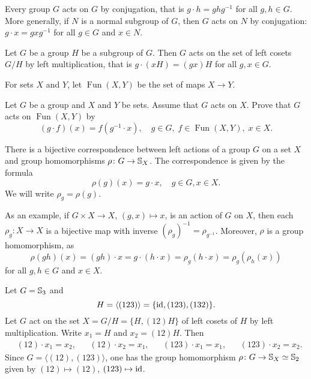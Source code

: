\begin{example}
Every group $G$ acts on $G$ by conjugation, that is
$g\cdot h=ghg^{-1}$ for all $g,h\in G$. More generally, 
if $N$ is a normal subgroup of $G$, then $G$ acts on
$N$ by conjugation: $g\cdot x=gx
g^{-1}$ for all $g\in G$ and $x\in N$. 
\end{example}

\begin{example}
Let $G$ be a group $H$ be a subgroup of $G$. Then $G$ 
acts on the set of left cosets $G/H$ by left multiplication, that 
is $g\cdot (xH)=(gx)H$ for all $g,x\in G$.
\end{example}

For sets $X$ and $Y$, let 
$\operatorname{Fun}(X,Y)$ be the set of maps $X\to Y$. 

\begin{exercise}
\label{xca:dual}
    Let $G$ be a group and $X$ and $Y$ be sets. Assume that $G$ acts on $X$. 
    Prove that 
    $G$ acts on $\operatorname{Fun}(X,Y)$ by 
    \[ 
        (g\cdot f)(x)=f(g^{-1}\cdot x),\quad g\in G,\; f\in\operatorname{Fun}(X,Y),\; x\in X.
    \]  
\end{exercise}

There is a bijective correspondence between 
left actions of a group $G$ on a set $X$ and
group homomorphisms 
$\rho\colon G\to\mathbb{S}_X$. The correspondence is given by
the formula 
\[
\rho(g)(x)=g\cdot x,\quad g\in G,x\in X.
\]
We will write $\rho_g=\rho(g)$.

As an example, if $G\times X\to X$, $(g,x)\mapsto x$, is 
an action of $G$ on $X$, then
each $\rho_g\colon X\to X$ is a bijective map with inverse 
$(\rho_g)^{-1}=\rho_{g^{-1}}$. Moreover, 
 $\rho$ is a group homomorphism, as 
\[
\rho(gh)(x)=(gh)\cdot x=g\cdot (h\cdot x)=\rho_g(h\cdot x)=\rho_g(\rho_h(x))
\]
for all $g,h\in G$ and $x\in X$.

\begin{example}
Let $G=\mathbb{S}_3$ and 
\[
H=\langle (123)\rangle=\{\operatorname{id},(123),(132)\}.
\]
Let $G$ act on the set $X=G/H=\{H,(12)H\}$ of left cosets of $H$ 
by left multiplication. Write 
$x_1=H$ and $x_2=(12)H$. Then
\begin{align*}
&(12)\cdot x_1=x_2,
&&(12)\cdot x_2=x_1,
&&(123)\cdot x_1=x_1,
&&(123)\cdot x_2=x_2.
\end{align*}
Since $G=\langle (12),(123)\rangle$, one has the group 
homomorphism 
$\rho\colon G\to\mathbb{S}_{X}\simeq\mathbb{S}_2$ given by
$(12)\mapsto (12)$, $(123)\mapsto\operatorname{id}$.
\end{example}

